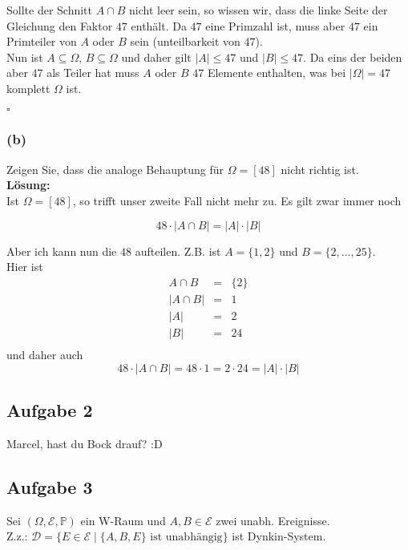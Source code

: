\documentclass[11pt,a4paper,ngerman]{article}
\newcommand{\set}[1]{ \{ #1 \}}
\newcommand{\Prob}{\mathbb{P}}
\newcommand{\Epsilon}{\mathcal{E}}
\begin{document}
Sollte der Schnitt $A \cap B$ nicht leer sein, so wissen wir, dass die linke Seite der Gleichung den Faktor $47$ enthält. Da $47$ eine Primzahl ist, muss
aber $47$ ein Primteiler von $A$ oder $B$ sein (unteilbarkeit von $47$).\\

Nun ist $A \subseteq \Omega$, $B \subseteq \Omega$ und daher gilt $|A| \leq 47$ und $|B| \leq 47$. Da eins der beiden aber $47$ als Teiler hat muss $A$ oder $B$
$47$ Elemente enthalten, was bei $|\Omega| = 47$ komplett $\Omega$ ist.

\mbox{}\hfill$\square$

\subsubsection*{(b)}

Zeigen Sie, dass die analoge Behauptung für $\Omega = [48]$ nicht richtig ist.\\

\textbf{Lösung:}\\

Ist $\Omega = \left[ 48 \right]$, so trifft unser zweite Fall nicht mehr zu. Es gilt zwar immer noch

\[
    48 \cdot \left| A \cap B \right| = |A| \cdot |B|
\]

Aber ich kann nun die $48$ aufteilen. Z.B. ist $A = \{1,2\}$ und $B = \{2,\ldots,25\}$.\\

Hier ist
\[
    \begin{array}{rcl}
        A \cap B    &=& \{2\}\\
        |A \cap B| &=& 1\\
        |A|     &=& 2\\
        |B|     &=& 24\\
    \end{array}
\]
und daher auch
\[
    48 \cdot \left| A \cap B \right| = 48 \cdot 1 = 2 \cdot 24 = |A| \cdot |B|
\]

\subsection*{Aufgabe 2}
Marcel, hast du Bock drauf? :D

\subsection*{Aufgabe 3}
\newcommand{\D}{\mathcal{D}}
Sei $(\Omega, \Epsilon, \Prob)$ ein W-Raum und $A,B \in \Epsilon$ zwei unabh. Ereignisse. \\
Z.z.: $\mathcal{D} = \set{E \in \Epsilon \; | \; \set{A,B, E} \text{ ist unabhängig}}$ ist Dynkin-System. \\
\end{document}
